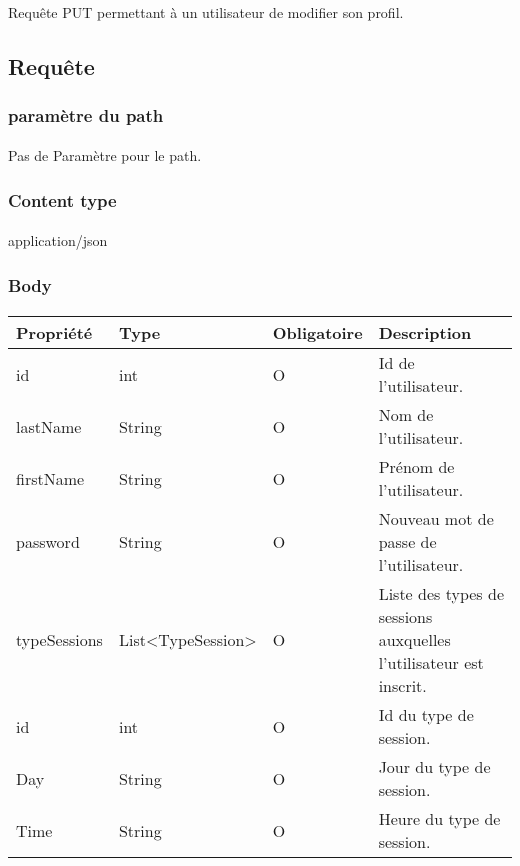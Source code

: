 \paragraph{}
	Requête PUT permettant à un utilisateur de modifier son profil.

\subsection{Requête}
	\subsubsection{paramètre du path}
		\paragraph{}
			Pas de Paramètre pour le path.
	
	\subsubsection{Content type}
		\paragraph{}
			application/json
			
	\subsubsection{Body}
		\paragraph{}
			\begin{center}
				\begin{tabularx}{\textwidth}{| T{0.2122\textwidth} | S{0.22\textwidth} | S{0.15\textwidth} | S{0.3\textwidth} |}
					\hline
					Propriété & Type & Obligatoire & Description \\
					\hline
					id & int & O & Id de l'utilisateur. \\
					\hline
					lastName & String & O & Nom de l'utilisateur. \\
					\hline
					firstName & String & O & Prénom de l'utilisateur. \\
					\hline
					password & String & O & Nouveau mot de passe de l'utilisateur. \\
					\hline
					typeSessions & List<TypeSession> & O & Liste des types de sessions auxquelles l'utilisateur est inscrit. \\
					\hline
					
					\hline
					
					\hline
					id & int & O & Id du type de session. \\
					\hline 
					Day & String & O & Jour du type de session. \\
					\hline
					Time & String & O & Heure du type de session. \\
					\hline
				\end{tabularx}
			\end{center}
			
